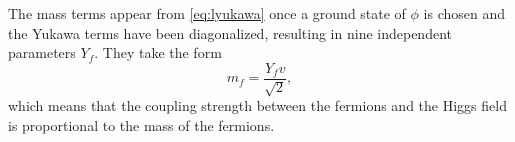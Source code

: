The mass terms appear from \cref{eq:lyukawa} once a ground state of $\phi$ is chosen and the Yukawa terms have been diagonalized, resulting in nine independent parameters $Y_f$. 
They take the form
\begin{equation}
  m_f = \frac{Y_f v}{\sqrt{2}},
\end{equation}
which means that the coupling strength between the fermions and the Higgs field is proportional to the mass of the fermions.


